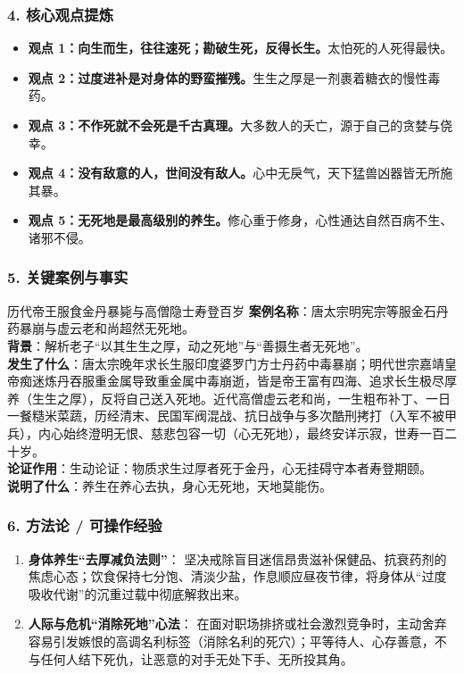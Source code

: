 \subsubsection{4. 核心观点提炼}
\begin{itemize}
    \item \textbf{观点 1：向生而生，往往速死；勘破生死，反得长生。}太怕死的人死得最快。
    \item \textbf{观点 2：过度进补是对身体的野蛮摧残。}生生之厚是一剂裹着糖衣的慢性毒药。
    \item \textbf{观点 3：不作死就不会死是千古真理。}大多数人的夭亡，源于自己的贪婪与侥幸。
    \item \textbf{观点 4：没有敌意的人，世间没有敌人。}心中无戾气，天下猛兽凶器皆无所施其暴。
    \item \textbf{观点 5：无死地是最高级别的养生。}修心重于修身，心性通达自然百病不生、诸邪不侵。
\end{itemize}

\subsubsection{5. 关键案例与事实}
\begin{CaseBox}{历代帝王服食金丹暴毙与高僧隐士寿登百岁}
\textbf{案例名称}：唐太宗明宪宗等服金石丹药暴崩与虚云老和尚超然无死地。\\
\textbf{背景}：解析老子“以其生生之厚，动之死地”与“善摄生者无死地”。\\
\textbf{发生了什么}：唐太宗晚年求长生服印度婆罗门方士丹药中毒暴崩；明代世宗嘉靖皇帝痴迷炼丹吞服重金属导致重金属中毒崩逝，皆是帝王富有四海、追求长生极尽厚养（生生之厚），反将自己送入死地。近代高僧虚云老和尚，一生粗布补丁、一日一餐糙米菜蔬，历经清末、民国军阀混战、抗日战争与多次酷刑拷打（入军不被甲兵），内心始终澄明无恨、慈悲包容一切（心无死地），最终安详示寂，世寿一百二十岁。\\
\textbf{论证作用}：生动论证：物质求生过厚者死于金丹，心无挂碍守本者寿登期颐。\\
\textbf{说明了什么}：养生在养心去执，身心无死地，天地莫能伤。
\end{CaseBox}

\subsubsection{6. 方法论 / 可操作经验}
\begin{enumerate}
    \item \textbf{身体养生“去厚减负法则”}：
    坚决戒除盲目迷信昂贵滋补保健品、抗衰药剂的焦虑心态；饮食保持七分饱、清淡少盐，作息顺应昼夜节律，将身体从“过度吸收代谢”的沉重过载中彻底解救出来。
    \item \textbf{人际与危机“消除死地”心法}：
    在面对职场排挤或社会激烈竞争时，主动舍弃容易引发嫉恨的高调名利标签（消除名利的死穴）；平等待人、心存善意，不与任何人结下死仇，让恶意的对手无处下手、无所投其角。
\end{enumerate}

